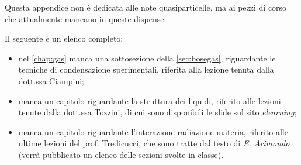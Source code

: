 
Questa appendice non è dedicata alle note quasiparticelle, ma ai pezzi di corso che attualmente mancano in queste dispense.

Il seguente è un elenco completo:
\begin{itemize}
	\item nel \cref{chap:gas} manca una sottosezione della \cref{sec:bosegas}, riguardante le tecniche di condensazione sperimentali, riferita alla lezione tenuta dalla dott.ssa Ciampini;
	\item manca un capitolo riguardante la struttura dei liquidi, riferito alle lezioni tenute dalla dott.ssa Tozzini, di cui sono disponibili le slide sul sito \textit{elearning};
	\item manca un capitolo riguardante l'interazione radiazione-materia, riferito alle ultime lezioni del prof. Tredicucci, che sono tratte dal testo di \textit{E. Arimondo} (verrà pubblicato un elenco delle sezioni svolte in classe).
\end{itemize}